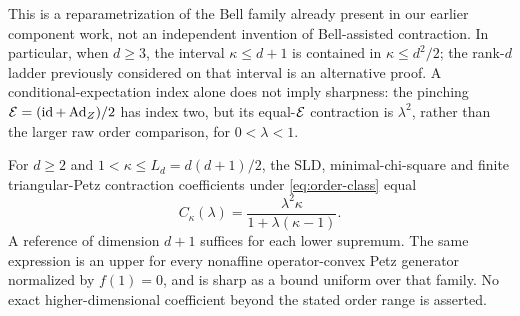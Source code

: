 This is a reparametrization of the Bell family already present in our earlier component work, not an independent invention of Bell-assisted contraction. In particular, when \(d\ge3\), the interval \(\kappa\le d+1\) is contained in \(\kappa\le d^2/2\); the rank-\(d\) ladder previously considered on that interval is an alternative proof. A conditional-expectation index alone does not imply sharpness: the pinching \(\mathcal E=(\operatorname{id}+\operatorname{Ad}_Z)/2\) has index two, but its equal-\(\mathcal E\) contraction is \(\lambda^2\), rather than the larger raw order comparison, for \(0<\lambda<1\).

\begin{theorem}\label{thm:order}
For \(d\ge2\) and \(1<\kappa\le L_d=d(d+1)/2\), the SLD, minimal-chi-square and finite triangular-Petz contraction coefficients under \eqref{eq:order-class} equal
\begin{equation}\label{eq:profile}
 C_\kappa(\lambda)=\frac{\lambda^2\kappa}{1+\lambda(\kappa-1)}.
\end{equation}
A reference of dimension \(d+1\) suffices for each lower supremum. The same expression is an upper for every nonaffine operator-convex Petz generator normalized by \(f(1)=0\), and is sharp as a bound uniform over that family. No exact higher-dimensional coefficient beyond the stated order range is asserted.
\end{theorem}

